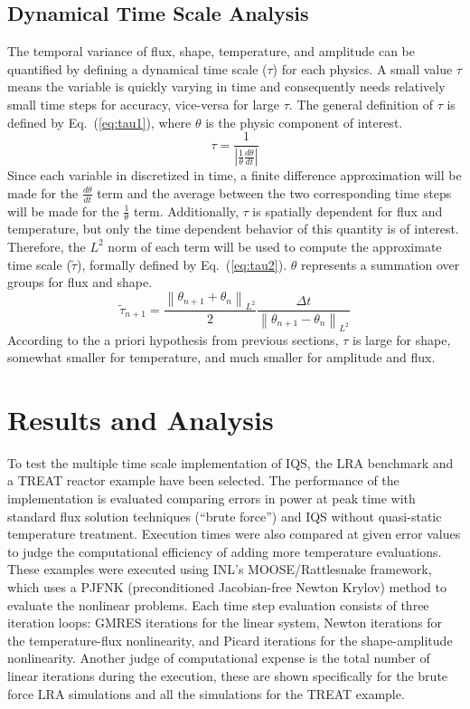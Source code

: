 \documentclass{anstrans}
\newcommand{\eqt}[1]{Eq.~(\ref{#1})}                     %
\newcommand{\be}{\begin{equation}}
\newcommand{\ee}{\end{equation}}
\newcommand{\norm}[1]{\left\lVert#1\right\rVert_{L^2}}
\begin{document}
\subsection{Dynamical Time Scale Analysis}
\label{sect:tau}

The temporal variance of flux, shape, temperature, and amplitude can be quantified by defining a dynamical time scale ($\tau$) for each physics.  A small value $\tau$ means the variable is quickly varying in time and consequently needs relatively small time steps for accuracy, vice-versa for large $\tau$.  The general definition of $\tau$ is defined by \eqt{eq:tau1}, where $\theta$ is the physic component of interest.  
\be
\tau = \frac{1}{\left|\frac{1}{\theta}\frac{d\theta}{dt}\right|}
\label{eq:tau1}
\ee
Since each variable in discretized in time, a finite difference approximation will be made for the $\frac{d\theta}{dt}$ term and the average between the two corresponding time steps will be made for the $\frac{1}{\theta}$ term.  Additionally, $\tau$ is spatially dependent for flux and temperature, but only the time dependent behavior of this quantity is of interest.  Therefore, the $L^2$ norm of each term will be used to compute the approximate time scale ($\tilde{\tau}$), formally defined by \eqt{eq:tau2}.  $\theta$ represents a summation over groups for flux and shape.
\be
\tilde{\tau}_{n+1} = \frac{\norm{\theta_{n+1} + \theta_{n}}}{2}\frac{\Delta t}{\norm{\theta_{n+1} - \theta_{n}}}
\label{eq:tau2}
\ee
%
According to the a priori hypothesis from previous sections, $\tau$ is large for shape, somewhat smaller for temperature, and much smaller for amplitude and flux.


\section{Results and Analysis}

To test the multiple time scale implementation of IQS, the LRA benchmark 
\cite{ANL_BPB} and a TREAT reactor example have been selected. The performance of the implementation is evaluated comparing errors in power at peak time with standard flux solution techniques (``brute force'') and IQS without quasi-static temperature treatment.  Execution times were also compared at given error values to judge the computational efficiency of adding more temperature evaluations.  These examples were executed using INL's MOOSE/Rattlesnake framework, which uses a PJFNK (preconditioned Jacobian-free Newton Krylov) method to evaluate the nonlinear problems.  Each time step evaluation consists of three iteration loops: GMRES iterations for the linear system, Newton iterations for the temperature-flux nonlinearity, and Picard iterations for the shape-amplitude nonlinearity.  Another judge of computational expense is the total number of linear iterations during the execution, these are shown specifically for the brute force LRA simulations and all the simulations for the TREAT example.
\end{document}
